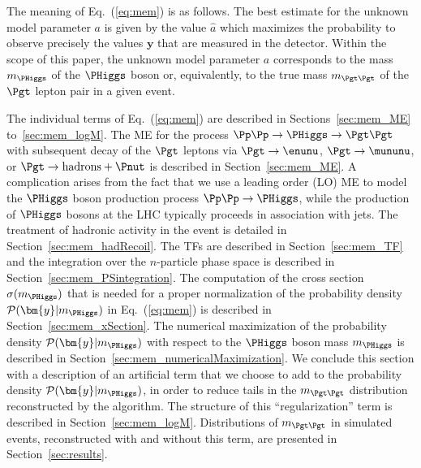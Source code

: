 The meaning of Eq.~(\ref{eq:mem}) is as follows.
The best estimate for the unknown model parameter $a$ is given by the
value $\hat{a}$ which maximizes the probability to observe precisely the 
values $\bm{y}$ that are measured in the detector. 
Within the scope of this paper, the unknown model parameter $a$
corresponds to the mass $m_{\PHiggs}$ of the $\PHiggs$ boson or,
equivalently, to the true mass $m_{\Pgt\Pgt}$ of the $\Pgt$ lepton
pair in a given event.

The individual terms of Eq.~(\ref{eq:mem}) are described in
Sections~\ref{sec:mem_ME} to~\ref{sec:mem_logM}.
The ME for the process $\Pp\Pp \to \PHiggs \to \Pgt\Pgt$
with subsequent decay of the $\Pgt$ leptons 
via $\Pgt \to \enunu$, $\Pgt \to \mununu$, or $\Pgt \to \textrm{hadrons} + \Pnut$
is described in Section~\ref{sec:mem_ME}.
A complication arises from the fact that we use a leading order (LO)
ME to model the $\PHiggs$ boson production process $\Pp\Pp \to
\PHiggs$, while the production of $\PHiggs$ bosons at the LHC typically
proceeds in association with jets.
The treatment of hadronic activity in the event is detailed in Section~\ref{sec:mem_hadRecoil}.
The TFs are described in Section~\ref{sec:mem_TF} and
the integration over the $n$-particle phase space is described in
Section~\ref{sec:mem_PSintegration}.
The computation of the cross section $\sigma(m_{\PHiggs})$ that is needed for a proper normalization of the probability density $\mathcal{P}(\bm{y}|m_{\PHiggs})$
in Eq.~(\ref{eq:mem}) is described in Section~\ref{sec:mem_xSection}.
The numerical maximization of the probability density $\mathcal{P}(\bm{y}|m_{\PHiggs})$
with respect to the $\PHiggs$ boson mass $m_{\PHiggs}$ is described in
Section~\ref{sec:mem_numericalMaximization}.
We conclude this section with a description of an artificial term that we
choose to add to the probability density $\mathcal{P}(\bm{y}|m_{\PHiggs})$, in
order to reduce tails in the $m_{\Pgt\Pgt}$ distribution reconstructed
by the algorithm. The structure of this ``regularization'' term is described in
Section~\ref{sec:mem_logM}.
Distributions of $m_{\Pgt\Pgt}$ in simulated events,
reconstructed with and without this term, are presented in Section~\ref{sec:results}.



